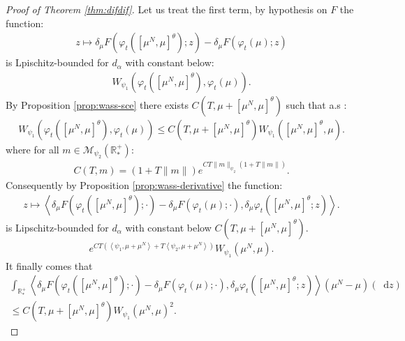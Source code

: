 \documentclass[11pt,a4paper]{article}
\newcommand{\RRP}{\mathbb{R}^+_*}
\newcommand{\MC}{\mathcal{M}}
\newcommand{\brac}[1]{\left\langle#1\right\rangle}
\newcommand{\dd}{\mathop{}\!\mathrm{d}}
\begin{document}
\begin{proof}[Proof of Theorem \ref{thm:difdif}]
    Let us treat the first term, by hypothesis on $F$ the function:
    \begin{align*}
        z \mapsto \delta_\mu F\left(\varphi_t \left(\left[\mu^N,\mu \right]^\theta\right);z \right)- \delta_\mu F\left(\varphi_t \left(\mu\right);z \right)
    \end{align*}
    is Lpischitz-bounded for $d_\alpha$ with constant below:
    \begin{align*}
        W_{\psi_1}\left(\varphi_t \left(\left[\mu^N,\mu \right]^\theta\right), \varphi_t \left(\mu \right)\right).
    \end{align*}
    By Proposition \ref{prop:wass-sce} there exists $C(T,\mu + \left[\mu^N,\mu \right]^\theta)$ such that a.s :
    \begin{align*}
        W_{\psi_1}\left(\varphi_t \left(\left[\mu^N,\mu \right]^\theta\right), \varphi_t \left(\mu \right)\right) \leq C(T,\mu + \left[\mu^N,\mu \right]^\theta)W_{\psi_1}\left( \left[\mu^N,\mu \right]^\theta , \mu\right).
    \end{align*}
    where for all $m \in \MC_{\psi_2}(\RRP)$:
    \begin{align*}
        C(T,m) = \left( 1 + T\|m\|\right)e^{CT\|m\|_{\psi_2}\left(1 + T \|m\| \right)}.
    \end{align*}
    Consequently by Proposition \ref{prop:wass-derivative} the function: 
    \begin{align*}
         z \mapsto \brac{\delta_\mu F\left(\varphi_t \left(\left[\mu^N,\mu \right]^\theta\right);\cdot \right)- \delta_\mu F\left(\varphi_t \left(\mu\right);\cdot \right), \delta_\mu \varphi_t\left(\left[\mu^N,\mu \right]^\theta;z \right)}.
    \end{align*}
    is Lipschitz-bounded for $d_\alpha$ with constant below $C(T, \mu + \left[\mu^N,\mu \right]^\theta)$.
    \begin{align*}
        e^{CT\left(\brac{\psi_1,\mu + \mu^N} + T\brac{\psi_2,\mu + \mu^N}\right)}W_{\psi_1}\left( \mu^N , \mu\right).
    \end{align*}
    It finally comes that 
    \begin{multline*}
        \int_{\RRP} \brac{\delta_\mu F\left(\varphi_t \left(\left[\mu^N,\mu \right]^\theta\right);\cdot \right)- \delta_\mu F\left(\varphi_t \left(\mu\right);\cdot \right), \delta_\mu \varphi_t\left(\left[\mu^N,\mu \right]^\theta;z \right)} \left(\mu^N - \mu\right)(\dd z) \\
        \leq C(T, \mu + \left[\mu^N,\mu \right]^\theta) W_{\psi_1}\left( \mu^N , \mu\right)^2.

\end{multline*}
\end{proof}
\end{document}

